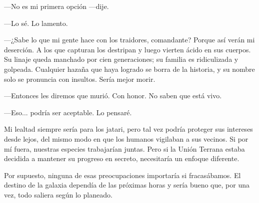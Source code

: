 —No es mi primera opción —dije.

—Lo sé. Lo lamento.

 —¿Sabe lo que mi gente hace con los traidores, comandante? Porque así verán mi deserción. A los que capturan los destripan y luego vierten ácido en sus cuerpos. Su linaje queda manchado por cien generaciones; su familia es ridiculizada y golpeada. Cualquier hazaña que haya logrado se borra de la historia, y su nombre solo se pronuncia con insultos. Sería mejor morir.

—Entonces les diremos que murió. Con honor. No saben que está vivo.

—Eso... podría ser aceptable. Lo pensaré.

Mi lealtad siempre sería para los jatari, pero tal vez podría proteger sus intereses desde lejos, del mismo modo en que los humanos vigilaban a sus vecinos. Si por mí fuera, nuestras especies trabajarían juntas. Pero si la Unión Terrana estaba decidida a mantener su progreso en secreto, necesitaría un enfoque diferente.

Por supuesto, ninguna de esas preocupaciones importaría si fracasábamos. El destino de la galaxia dependía de las próximas horas y sería bueno que, por una vez, todo saliera según lo planeado.